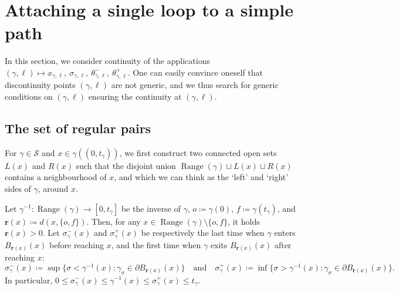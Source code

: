 \documentclass[11pt]{article}
\DeclareMathOperator{\Range}{Range}
\def\rhos{\mathbf{r}}
\begin{document}
\section{Attaching a single loop to a simple path}
\label{sec:attaching}
In this section, we consider continuity of the applications $(\gamma,\ell)\mapsto x_{\gamma,\ell},\ \sigma_{\gamma,\ell},\ \theta^{-}_{\gamma,\ell},\ \theta^+_{\gamma,\ell}$. One can easily convince oneself that discontinuity points $(\gamma,\ell)$ are not generic, and we thus search for generic conditions on $(\gamma,\ell)$ ensuring the continuity at $(\gamma,\ell)$.
%








\subsection{The set of regular pairs}
\label{sec:regPairs}

For $\gamma\in \mathscr{S}$ and $x\in \gamma((0,t_\gamma))$, we first construct two connected open sets $L(x)$ and $R(x)$ such that the disjoint union $\Range(\gamma)\sqcup L(x)\sqcup R(x)$ contains a neighbourhood of $x$, and which we can think as the `left' and `right' sides of $\gamma$, around $x$.

Let $\gamma^{-1}:\Range(\gamma)\to [0,t_\gamma]$ be the inverse of $\gamma$, $o\coloneqq \gamma(0)$, $f\coloneqq \gamma(t_\gamma)$, and $\rhos(x)\coloneqq d(x,\{ o,f\} )$. Then, for any $x\in \Range(\gamma)\setminus\{o,f\} $, it holds $\rhos(x)>0$. Let
$\sigma_\gamma^-(x)$ and $\sigma_\gamma^+(x)$ be respectively the last time when $\gamma$ enters $B_{\rhos(x)}(x)$ before reaching $x$, and the first time when $\gamma$ exits $B_{\rhos(x)}(x)$ after reaching $x$:
\[\sigma_\gamma^-(x)\coloneqq  \sup\{ \sigma< \gamma^{-1}(x) : \gamma_\sigma \in \partial B_{\rhos(x)}(x) \}\quad\text{and}\quad\sigma_\gamma^+(x)\coloneqq  \inf\{ \sigma> \gamma^{-1}(x): \gamma_\sigma \in \partial B_{\rhos(x)}(x) \}.\]
In particular, $0\leq \sigma_\gamma^-(x)\leq \gamma^{-1}(x)\leq \sigma_\gamma^+(x)\leq t_\gamma$.
\end{document}
